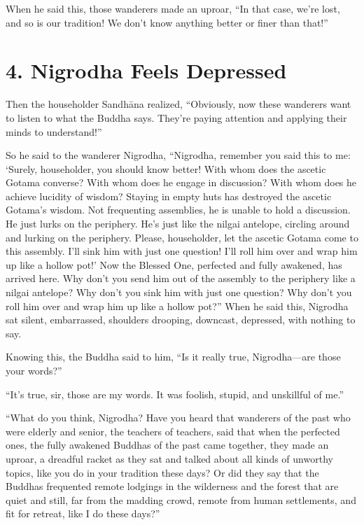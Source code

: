 \documentclass[12pt,openany]{book}%
\begin{document}
When he said this, those wanderers made an uproar, “In that case, we’re lost, and so is our tradition! We don’t know anything better or finer than that!” 

\section*{4. Nigrodha Feels Depressed }

Then the householder \textsanskrit{Sandhāna} realized, “Obviously, now these wanderers want to listen to what the Buddha says. They’re paying attention and applying their minds to understand!” 

So he said to the wanderer Nigrodha, “Nigrodha, remember you said this to me: ‘Surely, householder, you should know better! With whom does the ascetic Gotama converse? With whom does he engage in discussion? With whom does he achieve lucidity of wisdom? Staying in empty huts has destroyed the ascetic Gotama’s wisdom. Not frequenting assemblies, he is unable to hold a discussion. He just lurks on the periphery. He’s just like the nilgai antelope, circling around and lurking on the periphery. Please, householder, let the ascetic Gotama come to this assembly. I’ll sink him with just one question! I’ll roll him over and wrap him up like a hollow pot!’ Now the Blessed One, perfected and fully awakened, has arrived here. Why don’t you send him out of the assembly to the periphery like a nilgai antelope? Why don’t you sink him with just one question? Why don’t you roll him over and wrap him up like a hollow pot?” When he said this, Nigrodha sat silent, embarrassed, shoulders drooping, downcast, depressed, with nothing to say. 

Knowing this, the Buddha said to him, “Is it really true, Nigrodha—are those your words?” 

“It’s true, sir, those are my words. It was foolish, stupid, and unskillful of me.” 

“What do you think, Nigrodha? Have you heard that wanderers of the past who were elderly and senior, the teachers of teachers, said that when the perfected ones, the fully awakened Buddhas of the past came together, they made an uproar, a dreadful racket as they sat and talked about all kinds of unworthy topics, like you do in your tradition these days? Or did they say that the Buddhas frequented remote lodgings in the wilderness and the forest that are quiet and still, far from the madding crowd, remote from human settlements, and fit for retreat, like I do these days?” 
\end{document}

